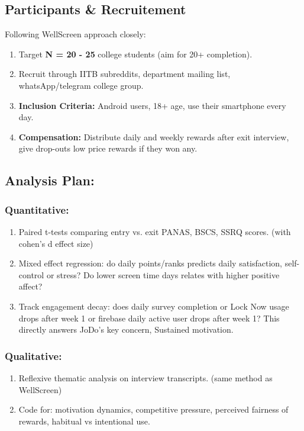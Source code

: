 \documentclass[12pt]{article}
\begin{document}
\subsection{Participants \& Recruitement}
Following WellScreen approach closely: 
\begin{enumerate}
    \item Target \textbf{N = 20 - 25} college students (aim for 20+ completion).
\item Recruit through IITB subreddits, department mailing list, whatsApp/telegram college group.
\item \textbf{Inclusion Criteria:} Android users, 18+ age, use their smartphone every day.
\item \textbf{Compensation:} Distribute daily and weekly rewards after exit interview, give drop-outs low price rewards if they won any.
\end{enumerate}
\subsection{Analysis Plan: }
\subsubsection{Quantitative: }
\begin{enumerate}
    \item Paired t-tests comparing entry vs. exit PANAS, BSCS, SSRQ scores. (with cohen's d effect size)
    \item Mixed effect regression: do daily points/ranks predicts daily satisfaction, self-control or stress? Do lower screen time days relates with higher positive affect?
    \item Track engagement decay: does daily survey completion or Lock Now usage drops after week 1 or firebase daily active user drops after week 1? This directly answers JoDo's key concern, Sustained motivation.
\end{enumerate}
\subsubsection{Qualitative: }
\begin{enumerate}
    \item Reflexive thematic analysis on interview transcripts. (same method as WellScreen)
    \item Code for: motivation dynamics, competitive pressure, perceived fairness of rewards, habitual vs intentional use.
\end{enumerate}
\end{document}
